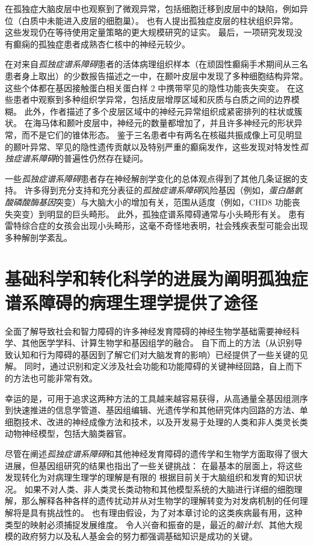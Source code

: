 在孤独症大脑皮层中也观察到了微观异常，包括细胞迁移到皮层中的缺陷，例如异位（白质中未能进入皮层的细胞巢）。
也有人提出孤独症皮层的柱状组织异常。
这些发现仍在等待使用定量策略的更大规模研究的证实。
最后，一项研究发现没有癫痫的孤独症患者成熟杏仁核中的神经元较少。


在对来自\textit{孤独症谱系障碍}患者的活体病理组织样本（在顽固性癫痫手术期间从三名患者身上取出）的少数报告描述之一中，在颞叶皮层中发现了多种细胞结构异常。
这些个体都在基因接触蛋白相关蛋白样 2 中携带罕见的隐性功能丧失突变。
在这些患者中观察到多种组织学异常，包括皮层增厚区域和灰质与白质之间的边界模糊。
此外，作者描述了多个皮层区域中的神经元异常组织成紧密排列的柱状或簇状。
在海马体和颞叶皮层中，神经元的数量都增加了，并且许多神经元的形状异常，而不是它们的锥体形态。
鉴于三名患者中有两名在核磁共振成像上可见明显的颞叶异常、罕见的隐性遗传贡献以及特别严重的癫痫发作，这些发现对特发性\textit{孤独症谱系障碍}的普遍性仍然存在疑问。


一些\textit{孤独症谱系障碍}患者存在神经解剖学变化的总体观点得到了其他几条证据的支持。
许多得到充分支持和充分表征的\textit{孤独症谱系障碍}风险基因（例如，\textit{蛋白酪氨酸磷酸酶基因}突变）与大脑大小的增加有关，范围从适度（例如，CHD8 功能丧失突变）到明显的巨头畸形。
此外，孤独症谱系障碍通常与小头畸形有关。
患有雷特综合症的女孩会出现小头畸形，这毫不奇怪地表明，社会残疾表型可能会出现多种解剖学紊乱。



\section{基础科学和转化科学的进展为阐明孤独症谱系障碍的病理生理学提供了途径}

全面了解导致社会和智力障碍的许多神经发育障碍的神经生物学基础需要神经科学、其他医学学科、计算生物学和基因组学的融合。
自下而上的方法（从识别导致认知和行为障碍的基因到了解它们对大脑发育的影响）已经提供了一些关键的见解。
同时，通过识别和定义涉及社会功能和功能障碍的关键神经回路，自上而下的方法也可能非常有效。


幸运的是，可用于追求这两种方法的工具越来越容易获得，从高通量全基因组测序到快速推进的信息学管道、基因组编辑、光遗传学和其他研究体内回路的方法、单细胞技术、改进的神经成像方法和技术，以及开发易于处理的人类和非人类灵长类动物神经模型，包括大脑类器官。


尽管在阐述\textit{孤独症谱系障碍}和其他神经发育障碍的遗传学和生物学方面取得了很大进展，但基因组研究的结果也指出了一些关键挑战：
在最基本的层面上，将这些发现转化为对病理生理学的理解是有限的 根据目前关于大脑组织和发育的知识状况。
如果不对人类、非人类灵长类动物和其他模型系统的大脑进行详细的细胞理解，那么解释各种各样的遗传扰动并从对生物学的理解转变为对发病机制的任何理解将是具有挑战性的。
也有理由假设，为了对本章讨论的这类疾病最有用，这种类型的映射必须捕捉发展维度。
令人兴奋和振奋的是，最近的\textit{脑计划}、其他大规模的政府努力以及私人基金会的努力都强调基础知识是成功的关键。


